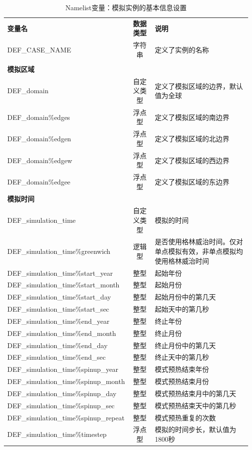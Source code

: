 \documentclass[a4paper,12pt,twoside]{article}
\begin{document}
\begin{table}[!htbp] \small
\caption{Namelist变量：模拟实例的基本信息设置} \label{table_nl_basic}
\centering \renewcommand{\arraystretch}{1.2}
\begin{tabular}{lcp{}}
\toprule
\textbf{变量名} & \textbf{数据类型} & \textbf{说明} \\
DEF\_CASE\_NAME & 字符串 & 定义了实例的名称 \\
 \\\midrule
\textbf{模拟区域} && \\
DEF\_domain & 自定义类型 & 定义了模拟区域的边界，默认值为全球 \\
DEF\_domain\%edges & 浮点型 & 定义了模拟区域的南边界 \\
DEF\_domain\%edgen & 浮点型 & 定义了模拟区域的北边界 \\
DEF\_domain\%edgew & 浮点型 & 定义了模拟区域的西边界 \\
DEF\_domain\%edgee & 浮点型 & 定义了模拟区域的东边界 \\\midrule
\textbf{模拟时间} && \\
DEF\_simulation\_time & 自定义类型 & 模拟的时间 \\
DEF\_simulation\_time\%greenwich & 逻辑型 & 是否使用格林威治时间。仅对单点模拟有效，非单点模拟均使用格林威治时间 \\
DEF\_simulation\_time\%start\_year & 整型 & 起始年份 \\
DEF\_simulation\_time\%start\_month & 整型 & 起始月份 \\
DEF\_simulation\_time\%start\_day & 整型 & 起始月份中的第几天 \\
DEF\_simulation\_time\%start\_sec & 整型 & 起始天中的第几秒 \\
DEF\_simulation\_time\%end\_year & 整型 & 终止年份 \\
DEF\_simulation\_time\%end\_month & 整型 & 终止月份 \\
DEF\_simulation\_time\%end\_day & 整型 & 终止月份中的第几天 \\
DEF\_simulation\_time\%end\_sec & 整型 & 终止天中的第几秒 \\
DEF\_simulation\_time\%spinup\_year & 整型 & 模式预热结束年份 \\
DEF\_simulation\_time\%spinup\_month & 整型 & 模式预热结束月份 \\
DEF\_simulation\_time\%spinup\_day & 整型 & 模式预热结束月中的第几天 \\
DEF\_simulation\_time\%spinup\_sec & 整型 & 模式预热结束天中的第几秒 \\
DEF\_simulation\_time\%spinup\_repeat & 整型 & 模式预热重复的次数 \\
DEF\_simulation\_time\%timestep & 浮点型 & 模拟的时间步长，默认值为1800秒 \\
\bottomrule
\end{tabular} 
\end{table}
\end{document}
